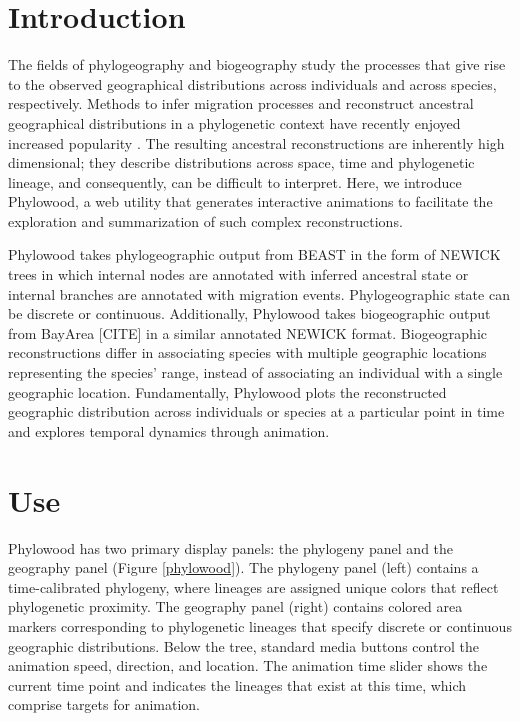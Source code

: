 \documentclass[11pt]{article}
\begin{document}
\section{Introduction}

The fields of phylogeography and biogeography study the processes that give rise to the observed geographical distributions across individuals and across species, respectively. Methods to infer migration processes and reconstruct ancestral geographical distributions in a phylogenetic context have recently enjoyed increased popularity \citep{ronquist97, beerli01, ree08, lemmon08, lemey09, yu10, landis12}. The resulting ancestral reconstructions are inherently high dimensional; they describe distributions across space, time and phylogenetic lineage, and consequently, can be difficult to interpret. Here, we introduce Phylowood, a web utility that generates interactive animations to facilitate the exploration and summarization of such complex reconstructions.

Phylowood takes phylogeographic output from BEAST \citep{drummond12} in the form of NEWICK trees in which internal nodes are annotated with inferred ancestral state or internal branches are annotated with migration events. Phylogeographic state can be discrete or continuous. Additionally, Phylowood takes biogeographic output from BayArea [CITE] in a similar annotated NEWICK format.  Biogeographic reconstructions differ in associating species with multiple geographic locations representing the species' range, instead of associating an individual with a single geographic location. Fundamentally, Phylowood plots the reconstructed geographic distribution across individuals or species at a particular point in time and explores temporal dynamics through animation.

\section{Use}

Phylowood has two primary display panels: the phylogeny panel and the geography panel (Figure \ref{phylowood}). The phylogeny panel (left) contains a time-calibrated phylogeny, where lineages are assigned unique colors that reflect phylogenetic proximity. The geography panel (right) contains colored area markers corresponding to phylogenetic lineages that specify discrete or continuous geographic distributions. Below the tree, standard media buttons control the animation speed, direction, and location. The animation time slider shows the current time point and indicates the lineages that exist at this time, which comprise targets for animation.
\end{document}
